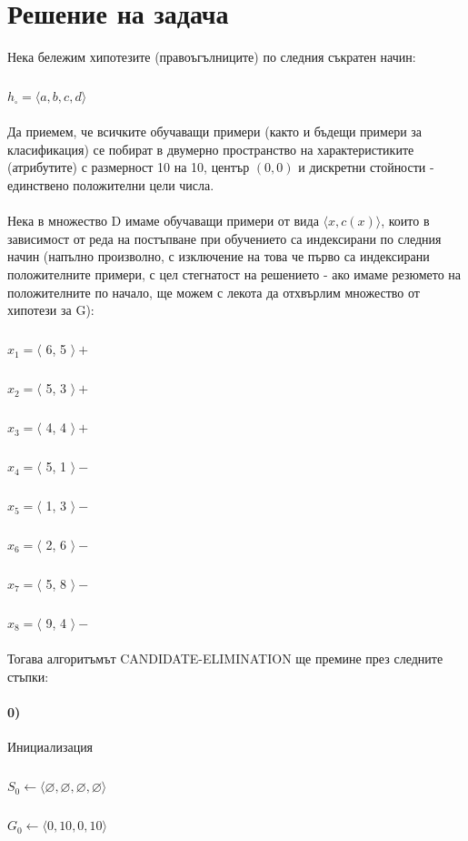 \documentclass[12pt]{article}
\begin{document}
	
	
	\newpage
	
	\section{Решение на задача }
	
	Нека бележим хипотезите (правоъгълниците) по следния съкратен начин:
		\subparagraph{}
		$h_{\square} = \langle a, b, c, d \rangle$
		
		\paragraph{}
	Да приемем, че всичките обучаващи примери (както и бъдещи примери за класификация) се побират в двумерно пространство на характеристиките (атрибутите) с размерност 10 на 10, център $(0, 0)$ и дискретни стойности - единствено положителни цели числа.
	
	\paragraph{}
	Нека в множество D имаме обучаващи примери от вида $\langle x, c(x) \rangle$, които в зависимост от реда на постъпване при обучението са индексирани по следния начин (напълно произволно, с изключение на това че първо са индексирани положителните примери, с цел стегнатост на решението - ако имаме резюмето на положителните по начало, ще можем с лекота да отхвърлим множество от хипотези за G):
	
		\subparagraph{}
		$x_{1} = \langle $ 6, 5 $\rangle  +$
		\subparagraph{}
		$x_{2} = \langle $ 5, 3 $\rangle  +$
		\subparagraph{}
		$x_{3} = \langle $ 4, 4 $\rangle  +$
		\subparagraph{}
		$x_{4} = \langle $ 5, 1 $\rangle  -$
		\subparagraph{}
		$x_{5} = \langle $ 1, 3 $\rangle  -$
		\subparagraph{}
		$x_{6} = \langle $ 2, 6 $\rangle  -$
		\subparagraph{}
		$x_{7} = \langle $ 5, 8 $\rangle  -$
		\subparagraph{}
		$x_{8} = \langle $ 9, 4 $\rangle  -$
	

	
	\paragraph{}
	Тогава алгоритъмът CANDIDATE-ELIMINATION ще премине през следните стъпки:\newline
	
	
	\paragraph{0)} Инициализация
		\subparagraph{}
		$S_{0} \leftarrow \langle \varnothing, \varnothing, \varnothing, \varnothing \rangle$
		\subparagraph{}
		$G_{0} \leftarrow \langle 0, 10, 0, 10 \rangle$
		
\end{document}
